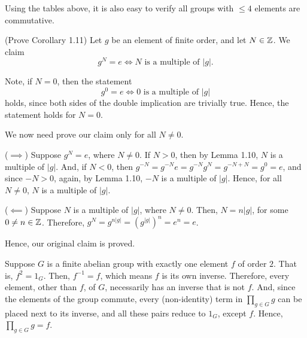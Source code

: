 \begin{xca}
Using the tables above, it is also easy to verify all groups with $\le 4$
elements are commutative.
\end{xca}

\begin{xca}
(Prove Corollary 1.11) Let $g$ be an element of finite order, and let $N \in
\mathbb{Z}$. We claim
\[ g^N = e \iff N \text{ is a multiple of } |g|. \]

Note, if $N = 0$, then the statement
\[ g^0 = e \iff 0 \text{ is a multiple of } |g| \]
holds, since both sides of the double implication are trivially true. Hence,
the statement holds for $N = 0$.

We now need prove our claim only for all $N \ne 0$.

($\implies$) Suppose $g^N = e$, where $N \ne 0$. If $N > 0$, then by Lemma 1.10,
$N$ is a multiple of $|g|$. And, if $N < 0$, then $g^{-N} = g^{-N} e = g^{-N}
g^N = g^{-N + N} = g^0 = e$, and since $-N > 0$, again, by Lemma 1.10, $-N$ is
a multiple of $|g|$. Hence, for all $N \ne 0$, $N$ is a multiple of $|g|$.

($\impliedby$) Suppose $N$ is a multiple of $|g|$, where $N \ne 0$. Then, $N =
n |g|$, for some $0 \ne n \in \mathbb{Z}$. Therefore, $g^N = g^{n|g|} = (g^{|g|})^n =
e^n = e$.

Hence, our original claim is proved.
\end{xca}

\begin{xca}
Suppose $G$ is a finite abelian group with exactly one element $f$ of order $2$.
That is, $f^2 = 1_G$. Then, $f^{-1} = f$, which means $f$ is its own inverse.
Therefore, every element, other than $f$, of $G$, necessarily has an inverse
that is not $f$. And, since the elements of the group commute, every
(non-identity) term in $\prod_{g \in G} g$ can be placed next to its inverse,
and all these pairs reduce to $1_G$, except $f$. Hence, $\prod_{g \in G} g =
f$.
\end{xca}
